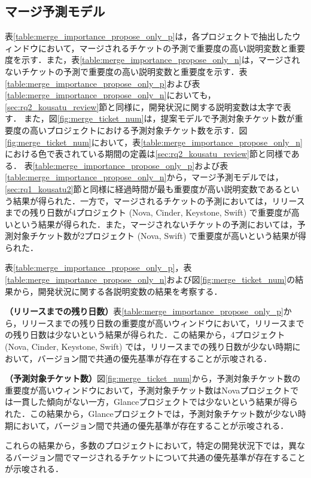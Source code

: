 \documentclass[11pt]{jreport}
\begin{document}
\subsection{マージ予測モデル}
表\ref{table:merge_importance_propose_only_p}は，各プロジェクトで抽出したウィンドウにおいて，マージされるチケットの予測で重要度の高い説明変数と重要度を示す．また，表\ref{table:merge_importance_propose_only_n}は，マージされないチケットの予測で重要度の高い説明変数と重要度を示す．表\ref{table:merge_importance_propose_only_p}および表\ref{table:merge_importance_propose_only_n}においても，\ref{sec:rq2_kousatu_review}節と同様に，開発状況に関する説明変数は太字で表す．
また，図\ref{fig:merge_ticket_num}は，提案モデルで予測対象チケット数が重要度の高いプロジェクトにおける予測対象チケット数を示す．図\ref{fig:merge_ticket_num}において，表\ref{table:merge_importance_propose_only_n}における色で表されている期間の定義は\ref{sec:rq2_kousatu_review}節と同様である．
表\ref{table:merge_importance_propose_only_p}および表\ref{table:merge_importance_propose_only_n}から，マージ予測モデルでは，\ref{sec:rq1_kousatu2}節と同様に経過時間が最も重要度が高い説明変数であるという結果が得られた．一方で，マージされるチケットの予測においては，リリースまでの残り日数が4プロジェクト (Nova, Cinder, Keystone, Swift) で重要度が高いという結果が得られた．また，マージされないチケットの予測においては，予測対象チケット数が2プロジェクト (Nova, Swift) で重要度が高いという結果が得られた．

表\ref{table:merge_importance_propose_only_p}，表\ref{table:merge_importance_propose_only_n}および図\ref{fig:merge_ticket_num}の結果から，開発状況に関する各説明変数の結果を考察する．

\textbf{（リリースまでの残り日数）}表\ref{table:merge_importance_propose_only_p}から，リリースまでの残り日数の重要度が高いウィンドウにおいて，リリースまでの残り日数は少ないという結果が得られた．この結果から，4プロジェクト (Nova, Cinder, Keystone, Swift) では，リリースまでの残り日数が少ない時期において，バージョン間で共通の優先基準が存在することが示唆される．

\textbf{（予測対象チケット数）}図\ref{fig:merge_ticket_num}から，予測対象チケット数の重要度が高いウィンドウにおいて，予測対象チケット数はNovaプロジェクトでは一貫した傾向がない一方，Glanceプロジェクトでは少ないという結果が得られた．この結果から，Glanceプロジェクトでは，予測対象チケット数が少ない時期において，バージョン間で共通の優先基準が存在することが示唆される．

これらの結果から，多数のプロジェクトにおいて，特定の開発状況下では，異なるバージョン間でマージされるチケットについて共通の優先基準が存在することが示唆される．
\end{document}
